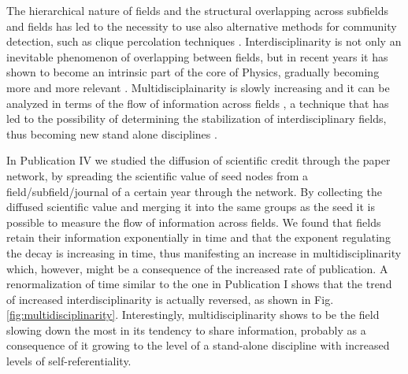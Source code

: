 The hierarchical nature  of fields and the structural overlapping across subfields and fields has led to the necessity to use also alternative methods for community detection, such
as clique percolation techniques \cite{Herrera2010}. Interdisciplinarity is not only an inevitable phenomenon of overlapping between fields,
but in recent years it has shown to become an intrinsic part of the core of Physics, gradually becoming more and more relevant \cite{Pan2012interdisciplinarity,Sinatra2015}.
Multidisciplainarity is slowly increasing and it can be analyzed in terms of the flow of information across fields \cite{Porter2009}, a technique that has led to the possibility of determining
the stabilization of interdisciplinary fields, thus becoming new stand alone disciplines \cite{10.1371/journal.pone.0008694}.

In Publication IV we studied the diffusion of scientific credit through the paper network, by spreading the scientific value of seed nodes from a field/subfield/journal of a certain year through the network.
By collecting the diffused scientific value and merging it into the same groups as the seed it is possible to measure the flow of information across fields. We found that
fields retain their information exponentially in time and that the exponent regulating the decay is increasing in time, thus manifesting an increase in multidisciplinarity which, 
however, might be a consequence of the increased rate of publication. A renormalization of time similar to the one in Publication I shows that the trend of increased interdisciplinarity is 
actually reversed, as shown in Fig.\ref{fig:multidisciplinarity}. Interestingly, multidisciplinarity shows to be the field slowing down the most in its tendency to share information, probably as a consequence
of it growing to the level of a stand-alone discipline with increased levels of self-referentiality.


